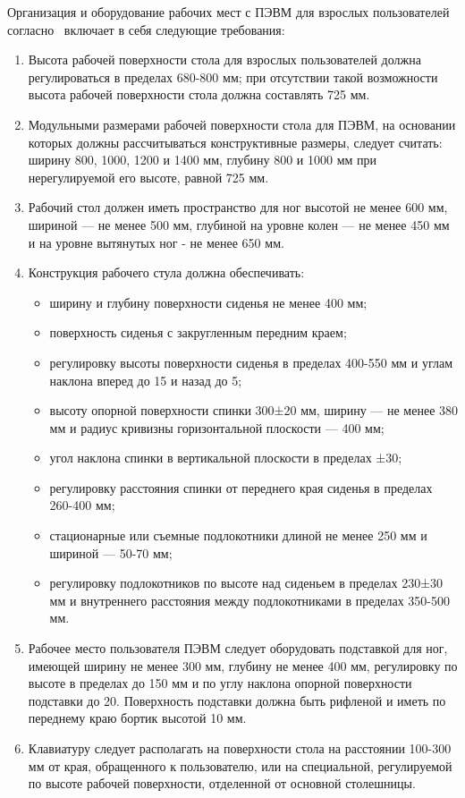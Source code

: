 Организация и оборудование рабочих мест с ПЭВМ для взрослых пользователей согласно~\cite{sanpin_2.4.1340-03}
включает в себя следующие требования:
\begin{enumerate}
 \item Высота рабочей поверхности стола для взрослых пользователей должна регулироваться в пределах 
 680-800 мм; при отсутствии такой возможности высота рабочей поверхности стола должна составлять 725 мм.
 \item Модульными размерами рабочей поверхности стола для ПЭВМ, на основании которых должны 
 рассчитываться конструктивные размеры, следует считать: ширину 800, 1000, 1200 и 1400 мм, глубину 800 
 и 1000 мм при нерегулируемой его высоте, равной 725 мм.
 \item Рабочий стол должен иметь пространство для ног высотой не менее 600 мм, шириной --- не менее 500 мм, 
 глубиной на уровне колен --- не менее 450 мм и на уровне вытянутых ног - не менее 650 мм.
 \item Конструкция рабочего стула должна обеспечивать:
 \begin{itemize}
  \item ширину и глубину поверхности сиденья не менее 400 мм;
  \item поверхность сиденья с закругленным передним краем;
  \item регулировку высоты поверхности сиденья в пределах 400-550 мм и углам наклона вперед до 15\textdegree{} и назад до 5\textdegree{};
  \item высоту опорной поверхности спинки 300±20 мм, ширину --- не менее 380 мм и радиус кривизны горизонтальной плоскости --- 400 мм;
  \item угол наклона спинки в вертикальной плоскости в пределах ±30\textdegree{};
  \item регулировку расстояния спинки от переднего края сиденья в пределах 260-400 мм;
  \item стационарные или съемные подлокотники длиной не менее 250 мм и шириной --- 50-70 мм;
  \item регулировку подлокотников по высоте над сиденьем в пределах 230±30 мм и внутреннего расстояния между 
  подлокотниками в пределах 350-500 мм.
 \end{itemize}
 \item Рабочее место пользователя ПЭВМ следует оборудовать подставкой для ног, имеющей ширину не менее 300 мм, глубину не менее 400 мм, 
 регулировку по высоте в пределах до 150 мм и по углу наклона опорной поверхности подставки 
 до 20\textdegree. Поверхность подставки должна быть рифленой и иметь по переднему краю бортик высотой 10 мм.
 \item Клавиатуру следует располагать на поверхности стола на расстоянии 100-300 мм от края, обращенного к пользователю, или на специальной, 
 регулируемой по высоте рабочей поверхности, отделенной от основной столешницы.
\end{enumerate}



